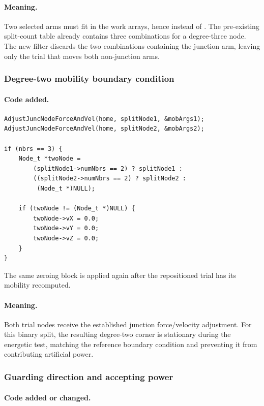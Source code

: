 \documentclass[11pt]{article}
\newcommand{\code}[1]{\texttt{\detokenize{#1}}}
\begin{document}
\paragraph{Meaning.}
Two selected arms must fit in the work arrays, hence
\code{nbrs - 1} instead of \code{nbrs - 2}.  The pre-existing split-count
table already contains three combinations for a degree-three node.  The new
filter discards the two combinations containing the junction arm, leaving
only the trial that moves both non-junction arms.

\subsubsection{Degree-two mobility boundary condition}

\paragraph{Code added.}

\begin{lstlisting}[style=cpp]
AdjustJuncNodeForceAndVel(home, splitNode1, &mobArgs1);
AdjustJuncNodeForceAndVel(home, splitNode2, &mobArgs2);

if (nbrs == 3) {
    Node_t *twoNode =
        (splitNode1->numNbrs == 2) ? splitNode1 :
        ((splitNode2->numNbrs == 2) ? splitNode2 :
         (Node_t *)NULL);

    if (twoNode != (Node_t *)NULL) {
        twoNode->vX = 0.0;
        twoNode->vY = 0.0;
        twoNode->vZ = 0.0;
    }
}
\end{lstlisting}

The same zeroing block is applied again after the repositioned trial has its
mobility recomputed.

\paragraph{Meaning.}
Both trial nodes receive the established junction force/velocity adjustment.
For this binary split, the resulting degree-two corner is stationary during
the energetic test, matching the reference boundary condition and preventing
it from contributing artificial power.

\subsubsection{Guarding direction and accepting power}

\paragraph{Code added or changed.}
\end{document}
